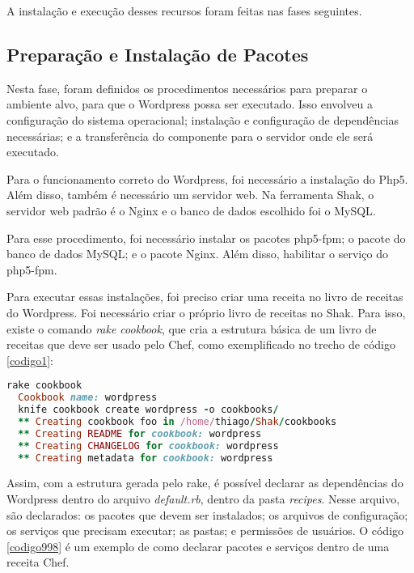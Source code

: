 A instalação e execução desses recursos foram feitas nas fases seguintes.

\subsection{Preparação e Instalação de Pacotes}
\label{wordpress:preparacao}

Nesta fase, foram definidos os procedimentos necessários para 
preparar o ambiente alvo, para que o Wordpress
possa ser executado. Isso envolveu a configuração do sistema operacional; instalação
e configuração de dependências necessárias; e a transferência do componente
para o servidor onde ele será executado.

Para o funcionamento correto do Wordpress, foi necessário a instalação do Php5. Além
disso, também é necessário um servidor web. Na ferramenta Shak, o servidor
web padrão é o Nginx e o banco de dados escolhido foi o MySQL.

Para esse procedimento, foi necessário instalar os pacotes php5-fpm; o pacote
do banco de dados MySQL; e o pacote Nginx. Além disso, habilitar o serviço do
php5-fpm.
 
Para executar essas instalações, foi preciso criar uma receita no livro de receitas
do Wordpress. Foi necessário criar o próprio livro de receitas no Shak.
Para isso, existe o comando \textit{rake cookbook}, que cria a estrutura básica
de um livro de receitas que deve ser usado pelo Chef, como exemplificado no trecho
de código \ref{codigo1}:

\begin{lstlisting}[language=Ruby,label=dice_index,caption={Exemplo de criação de estrutura básica de livro de receitas do wordpress com shak}, label=codigo1]
  rake cookbook
  Cookbook name: wordpress
  knife cookbook create wordpress -o cookbooks/
  ** Creating cookbook foo in /home/thiago/Shak/cookbooks
  ** Creating README for cookbook: wordpress
  ** Creating CHANGELOG for cookbook: wordpress
  ** Creating metadata for cookbook: wordpress
\end{lstlisting}

Assim, com a estrutura gerada pelo rake, é possível declarar as dependências do Wordpress
dentro do arquivo \textit{default.rb}, dentro da pasta \textit{recipes}. Nesse 
arquivo, são declarados: os pacotes que devem ser instalados; os arquivos de configuração;
os serviços que precisam executar; as pastas; e permissões de usuários. O código \ref{codigo998}
é um exemplo de como declarar pacotes e serviços dentro de uma receita Chef.

